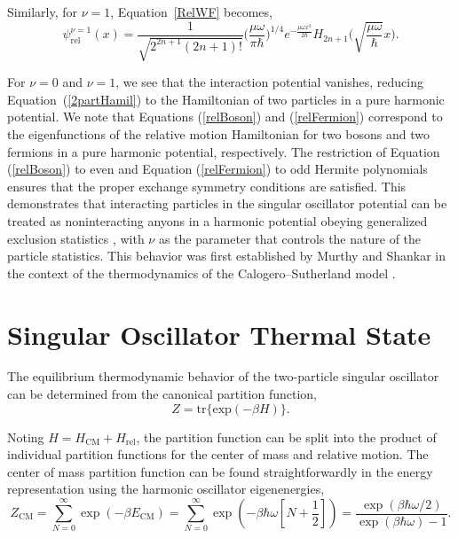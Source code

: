 \documentclass[preprints,article,accept,moreauthors,pdftex]{Definitions/mdpi}
\begin{document}
Similarly, for $\nu = 1$, Equation~\eqref{RelWF} becomes,  
\begin{equation}
	\label{relFermion}
	\psi_{\mathrm{rel}}^{\nu = 1}(x)=\frac{1}{\sqrt{2^{2n+1} (2n+1)!}} \bigg(\frac{\mu \omega}{\pi \hbar} \bigg)^{1/4} e^{- \frac{\mu \omega x^2}{2 \hbar}} H_{2n+1} \bigg( \sqrt{\frac{\mu \omega}{\hbar}}x\bigg).
\end{equation}

{For $\nu = 0$ and $\nu = 1$, we see that the interaction potential vanishes, reducing \mbox{Equation (\ref{2partHamil})} to the Hamiltonian of two particles in a pure harmonic potential. We note that Equations (\ref{relBoson}) and (\ref{relFermion}) correspond to the eigenfunctions of the relative motion Hamiltonian for two bosons and two fermions in a pure harmonic potential, respectively.} The restriction of Equation (\ref{relBoson}) to even and Equation (\ref{relFermion}) to odd Hermite polynomials ensures that the proper exchange symmetry conditions are satisfied. This demonstrates that interacting particles in the singular oscillator potential can be treated as noninteracting anyons in a harmonic potential obeying generalized exclusion statistics \cite{Haldane1991}, with $\nu$ as the parameter that controls the nature of the particle statistics. This behavior was first established by Murthy and Shankar in the context of the thermodynamics of the Calogero--Sutherland model \cite{Murthy1994}. 

\section{Singular Oscillator Thermal State}

The equilibrium thermodynamic behavior of the two-particle singular oscillator can be determined from the canonical partition function,
\begin{equation}
	Z = \mathrm{tr}\{\mathrm{exp}(-\beta H)\}. 
\end{equation}

Noting $H = H_{\mathrm{CM}}+H_{\mathrm{rel}}$, the partition function can be split into the product of individual partition functions for the center of mass and relative motion. The center of mass partition function can be found straightforwardly in the energy representation using the harmonic oscillator eigenenergies,
\begin{equation}
	Z_{\mathrm{CM}} = \sum_{N = 0}^{\infty}\exp(-\beta E_{\mathrm{CM}}) = \sum_{N = 0}^{\infty} \exp\left(-\beta \hbar \omega \left[N+\frac{1}{2}\right]\right) = \frac{\exp(\beta \hbar \omega/2)}{\exp(\beta \hbar \omega)-1}. 
\end{equation}
\end{document}
